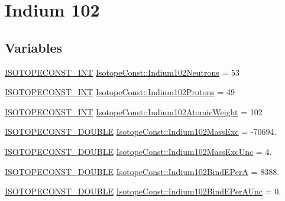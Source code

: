 \hypertarget{group___isotope_const-_indium-_in102}{}\section{Indium 102}
\label{group___isotope_const-_indium-_in102}
\subsection*{Variables}
\begin{DoxyCompactItemize}
\item 
\mbox{\hyperlink{group___isotope_const-_macros_ga5f18360b3e99483a35c32d789e62621c}{I\+S\+O\+T\+O\+P\+E\+C\+O\+N\+S\+T\+\_\+\+I\+NT}} \mbox{\hyperlink{group___isotope_const-_indium-_in102_ga37ee5af598c30623ef7e8d4f6c87bb5d}{Isotope\+Const\+::\+Indium102\+Neutrons}} = 53
\item 
\mbox{\hyperlink{group___isotope_const-_macros_ga5f18360b3e99483a35c32d789e62621c}{I\+S\+O\+T\+O\+P\+E\+C\+O\+N\+S\+T\+\_\+\+I\+NT}} \mbox{\hyperlink{group___isotope_const-_indium-_in102_gaba7702a1808d452be2b5a324d088d0d3}{Isotope\+Const\+::\+Indium102\+Protons}} = 49
\item 
\mbox{\hyperlink{group___isotope_const-_macros_ga5f18360b3e99483a35c32d789e62621c}{I\+S\+O\+T\+O\+P\+E\+C\+O\+N\+S\+T\+\_\+\+I\+NT}} \mbox{\hyperlink{group___isotope_const-_indium-_in102_ga15af0fb4bacbf7e71e43ac396f235cf8}{Isotope\+Const\+::\+Indium102\+Atomic\+Weight}} = 102
\item 
\mbox{\hyperlink{group___isotope_const-_macros_ga8f45a7272ce02c0b4c65c44636ed719a}{I\+S\+O\+T\+O\+P\+E\+C\+O\+N\+S\+T\+\_\+\+D\+O\+U\+B\+LE}} \mbox{\hyperlink{group___isotope_const-_indium-_in102_gabbe2994d2966f676fbd03e0d17d2e913}{Isotope\+Const\+::\+Indium102\+Mass\+Exc}} = -\/70694.
\item 
\mbox{\hyperlink{group___isotope_const-_macros_ga8f45a7272ce02c0b4c65c44636ed719a}{I\+S\+O\+T\+O\+P\+E\+C\+O\+N\+S\+T\+\_\+\+D\+O\+U\+B\+LE}} \mbox{\hyperlink{group___isotope_const-_indium-_in102_ga4dd6a569150ace239c6c51c09d417f5b}{Isotope\+Const\+::\+Indium102\+Mass\+Exc\+Unc}} = 4.
\item 
\mbox{\hyperlink{group___isotope_const-_macros_ga8f45a7272ce02c0b4c65c44636ed719a}{I\+S\+O\+T\+O\+P\+E\+C\+O\+N\+S\+T\+\_\+\+D\+O\+U\+B\+LE}} \mbox{\hyperlink{group___isotope_const-_indium-_in102_ga89e59494bfa632d906badf8137ce0576}{Isotope\+Const\+::\+Indium102\+Bind\+E\+PerA}} = 8388.
\item 
\mbox{\hyperlink{group___isotope_const-_macros_ga8f45a7272ce02c0b4c65c44636ed719a}{I\+S\+O\+T\+O\+P\+E\+C\+O\+N\+S\+T\+\_\+\+D\+O\+U\+B\+LE}} \mbox{\hyperlink{group___isotope_const-_indium-_in102_gac3d92385e281bcf355d1b416856dc5ca}{Isotope\+Const\+::\+Indium102\+Bind\+E\+Per\+A\+Unc}} = 0.

\end{DoxyCompactItemize}
